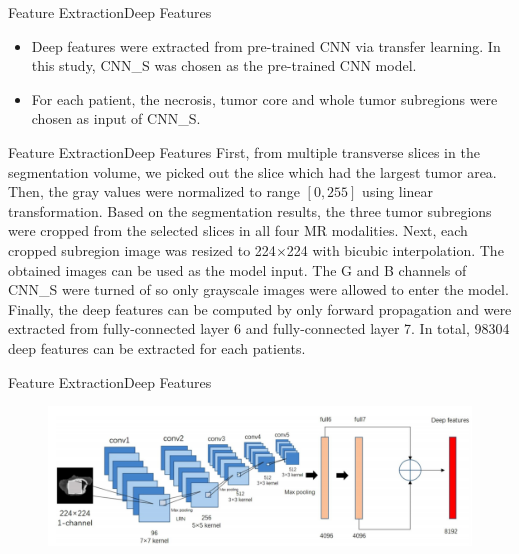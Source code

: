 \documentclass[
]{beamer}
\begin{document}
\begin{frame}{Feature Extraction}{Deep Features}
\begin{itemize}
	\item Deep features were extracted from pre-trained CNN via transfer learning. In this study, CNN\_S
	was chosen as the pre-trained CNN model.
	\item For each patient, the necrosis, tumor core and whole tumor subregions were chosen
	as input of CNN\_S.
\end{itemize}
\end{frame}

\begin{frame}{Feature Extraction}{Deep Features}
First, from multiple transverse slices in the segmentation volume, we picked out the slice
which had the largest tumor area. Then, the gray values were normalized to range 
$\left[0, 255\right]$ using linear transformation.
Based on the segmentation results, the three tumor subregions were cropped from the selected slices
in all four MR modalities. Next, each cropped subregion image was resized to 224$\times$224 with bicubic interpolation.
The obtained images can be used as the model input. The G and B channels of CNN\_S were turned of
so only grayscale images were allowed to enter the model. Finally, the deep features can be computed by only
forward propagation and were extracted from fully-connected layer 6 and fully-connected layer 7.  In total, 98304 deep features can be extracted for each patients.
\end{frame}

\begin{frame}{Feature Extraction}{Deep Features}
\begin{figure}
	\includegraphics[scale=0.4]{cnn1}
\end{figure}
\end{frame}
\end{document}
